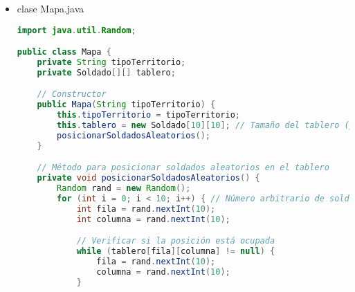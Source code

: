 \documentclass{article}
\begin{document}
\begin{itemize}
\begin{lstlisting}[language=java]
                case 2: misSoldados.add(new Caballero("\nC: "+i, 13, 7, 12));
                    break;

                case 3: misSoldados.add(new Arquero("\nA: "+i, 7, 3, 5, 20));
                    break;

                case 4: misSoldados.add(new Lancero("\nL: "+i, 5, 10, 8, 20));
                    break;
            }
        }
    }

    public String toString(){
        String todos ="";
        for(int i=0; i<misSoldados.size(); i++){
            todos += misSoldados.get(i)+"";
        }
        return cultura+" "+misSoldados.size()+" "+todos;
    }

    public int poder(){
        int poder = 0;
        for(int i=0; i<misSoldados.size(); i++){
            poder += misSoldados.get(i).getVida();
        }
        return poder;
    }

    public String getCultura(){
        return cultura;
    }

    public static void resetearCantidad(){
        Soldado.resetearCantidad();
        Arquero.resetearCantidad();
        Caballero.resetearCantidad();
        Espadachin.resetearCantidad();
        Lancero.resetearCantidad();
    }
}
        \end{lstlisting}

        \item clase Mapa.java
        \begin{lstlisting}[language=java]
import java.util.Random;

public class Mapa {
    private String tipoTerritorio;
    private Soldado[][] tablero;

    // Constructor
    public Mapa(String tipoTerritorio) {
        this.tipoTerritorio = tipoTerritorio;
        this.tablero = new Soldado[10][10]; // Tamaño del tablero (puedes ajustarlo según tus necesidades)
        posicionarSoldadosAleatorios();
    }

    // Método para posicionar soldados aleatorios en el tablero
    private void posicionarSoldadosAleatorios() {
        Random rand = new Random();
        for (int i = 0; i < 10; i++) { // Número arbitrario de soldados por ejército
            int fila = rand.nextInt(10);
            int columna = rand.nextInt(10);

            // Verificar si la posición está ocupada
            while (tablero[fila][columna] != null) {
                fila = rand.nextInt(10);
                columna = rand.nextInt(10);
            }


\end{lstlisting}
\end{itemize}
\end{document}
